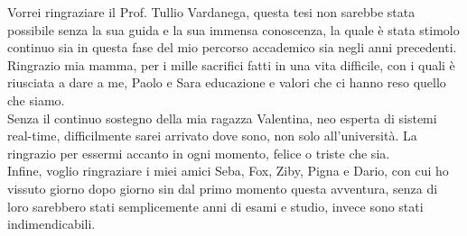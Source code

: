 Vorrei ringraziare il Prof. Tullio Vardanega, questa tesi non sarebbe stata possibile senza la sua guida e la sua immensa conoscenza, la quale è stata stimolo continuo sia in questa fase del mio percorso accademico sia negli anni precedenti.\\
Ringrazio mia mamma, per i mille sacrifici fatti in una vita difficile, con i quali è riusciata a dare a me, Paolo e Sara educazione e valori che ci hanno reso quello che siamo.\\
Senza il continuo sostegno della mia ragazza Valentina, neo esperta di sistemi real-time, difficilmente sarei arrivato dove sono, non solo all'università. La ringrazio per essermi accanto in ogni momento, felice o triste che sia.\\
Infine, voglio ringraziare i miei amici Seba, Fox, Ziby, Pigna e Dario, con cui ho vissuto giorno dopo giorno sin dal primo momento questa avventura, senza di loro sarebbero stati semplicemente anni di esami e studio, invece sono stati indimendicabili.